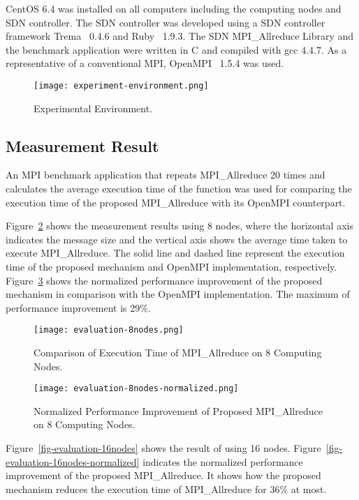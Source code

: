 CentOS 6.4 was installed on all computers including the computing nodes and
SDN controller. The SDN controller was developed using a SDN controller
framework Trema~\autocite{trema} 0.4.6 and Ruby~\autocite{ruby} 1.9.3. The SDN
MPI\_Allreduce Library and the benchmark application were written in C and
compiled with gcc 4.4.7. As a representative of a conventional MPI,
OpenMPI~\autocite{Gabriel2004} 1.5.4 was used.

\begin{figure}[htbp]
    \centering
    \texttt{[image: experiment-environment.png]}
    \caption{Experimental Environment.}%
    \label{fig-experiment-environment}
\end{figure}

\subsection{Measurement Result}

An MPI benchmark application that repeats MPI\_Allreduce 20
times and calculates the average execution time of the function was used
for comparing the execution time of the proposed MPI\_Allreduce
with its OpenMPI counterpart.

Figure~\ref{fig-evaluation-8nodes} shows the measurement results using 8
nodes, where the horizontal axis indicates the message size and the
vertical axis shows the average time taken to execute
MPI\_Allreduce. The solid line and dashed line represent the
execution time of the proposed mechanism and OpenMPI implementation,
respectively. Figure~\ref{fig-evaluation-8nodes-normalized} shows the
normalized performance improvement of the proposed mechanism in
comparison with the OpenMPI implementation. The maximum of performance
improvement is 29\%.

\begin{figure}[htbp]
    \centering
    \texttt{[image: evaluation-8nodes.png]}
    \caption{Comparison of Execution Time of MPI\_Allreduce on 8 Computing Nodes.}%
    \label{fig-evaluation-8nodes}
\end{figure}

\begin{figure}[htbp]
    \centering
    \texttt{[image: evaluation-8nodes-normalized.png]}
    \caption{Normalized Performance Improvement of Proposed MPI\_Allreduce on 8 Computing Nodes.}%
    \label{fig-evaluation-8nodes-normalized}
\end{figure}

Figure~\ref{fig-evaluation-16nodes} shows the result of using 16 nodes.
Figure~\ref{fig-evaluation-16nodes-normalized} indicates the normalized
performance improvement of the proposed MPI\_Allreduce. It
shows how the proposed mechanism reduces the execution time of
MPI\_Allreduce for 36\% at most.

